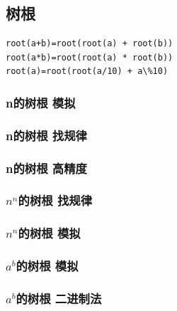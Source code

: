 \documentclass[a4paper]{article}
\begin{document}
\begin{CJK*}{UTF8}{gbsn}
\begin{multicols}{3}
\begin{flushleft}
\subsection{树根}
\begin{lstlisting}
root(a+b)=root(root(a) + root(b)) 
root(a*b)=root(root(a) * root(b)) 
root(a)=root(root(a/10) + a\%10)
\end{lstlisting}

\subsubsection{n的树根 模拟}


\subsubsection{n的树根 找规律}


\subsubsection{n的树根 高精度}


\subsubsection{\texorpdfstring{$n^n$}.的树根 找规律}


\subsubsection{\texorpdfstring{$n^n$}.的树根 模拟}


\subsubsection{\texorpdfstring{$a^b$}.的树根 模拟}


\subsubsection{\texorpdfstring{$a^b$}.的树根 二进制法}



\end{flushleft}
\end{multicols}
\end{CJK*}
\end{document}
